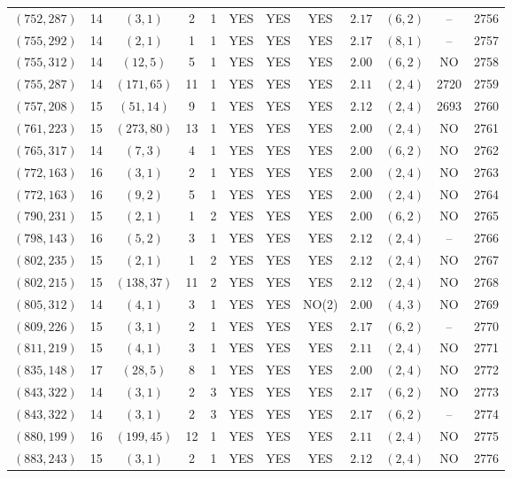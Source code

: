 \begin{longtable}{|c|c|c|c|c|c|c|c|c|c|c|c|}
$(752,287)$ & 14 & $(3,1)$ & 2 & 1 & YES & YES & YES & $2.17$ & $(6,2)$ & -- & 2756\\
$(755,292)$ & 14 & $(2,1)$ & 1 & 1 & YES & YES & YES & $2.17$ & $(8,1)$ & -- & 2757\\
$(755,312)$ & 14 & $(12,5)$ & 5 & 1 & YES & YES & YES & $2.00$ & $(6,2)$ & NO & 2758\\
$(755,287)$ & 14 & $(171,65)$ & 11 & 1 & YES & YES & YES & $2.11$ & $(2,4)$ & 2720 & 2759\\
$(757,208)$ & 15 & $(51,14)$ & 9 & 1 & YES & YES & YES & $2.12$ & $(2,4)$ & 2693 & 2760\\
$(761,223)$ & 15 & $(273,80)$ & 13 & 1 & YES & YES & YES & $2.00$ & $(2,4)$ & NO & 2761\\
$(765,317)$ & 14 & $(7,3)$ & 4 & 1 & YES & YES & YES & $2.00$ & $(6,2)$ & NO & 2762\\
$(772,163)$ & 16 & $(3,1)$ & 2 & 1 & YES & YES & YES & $2.00$ & $(2,4)$ & NO & 2763\\
$(772,163)$ & 16 & $(9,2)$ & 5 & 1 & YES & YES & YES & $2.00$ & $(2,4)$ & NO & 2764\\
$(790,231)$ & 15 & $(2,1)$ & 1 & 2 & YES & YES & YES & $2.00$ & $(6,2)$ & NO & 2765\\
$(798,143)$ & 16 & $(5,2)$ & 3 & 1 & YES & YES & YES & $2.12$ & $(2,4)$ & -- & 2766\\
$(802,235)$ & 15 & $(2,1)$ & 1 & 2 & YES & YES & YES & $2.12$ & $(2,4)$ & NO & 2767\\
$(802,215)$ & 15 & $(138,37)$ & 11 & 2 & YES & YES & YES & $2.12$ & $(2,4)$ & NO & 2768\\
$(805,312)$ & 14 & $(4,1)$ & 3 & 1 & YES & YES & NO(2) & $2.00$ & $(4,3)$ & NO & 2769\\
$(809,226)$ & 15 & $(3,1)$ & 2 & 1 & YES & YES & YES & $2.17$ & $(6,2)$ & -- & 2770\\
$(811,219)$ & 15 & $(4,1)$ & 3 & 1 & YES & YES & YES & $2.11$ & $(2,4)$ & NO & 2771\\
$(835,148)$ & 17 & $(28,5)$ & 8 & 1 & YES & YES & YES & $2.00$ & $(2,4)$ & NO & 2772\\
$(843,322)$ & 14 & $(3,1)$ & 2 & 3 & YES & YES & YES & $2.17$ & $(6,2)$ & NO & 2773\\
$(843,322)$ & 14 & $(3,1)$ & 2 & 3 & YES & YES & YES & $2.17$ & $(6,2)$ & -- & 2774\\
$(880,199)$ & 16 & $(199,45)$ & 12 & 1 & YES & YES & YES & $2.11$ & $(2,4)$ & NO & 2775\\
$(883,243)$ & 15 & $(3,1)$ & 2 & 1 & YES & YES & YES & $2.12$ & $(2,4)$ & NO & 2776\\

\end{longtable}
